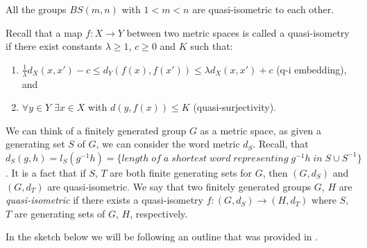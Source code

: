 \begin{corollary}
    All the groups $BS(m,n)$ with $1 < m <n$ are quasi-isometric to each other.
\end{corollary}

\begin{remark}
    Recall that a map $f: X \to Y$ between two metric spaces is called a quasi-isometry if there exist constants $\lambda \ge 1$, $c \ge 0$ and $K$ such that:
    \begin{enumerate}
        \item $\frac{1}{\lambda}d_X(x,x') - c \le d_Y(f(x),f(x')) \le \lambda d_X(x,x') + c$ (q-i embedding), and
        \item $\forall y \in Y$ $ \exists x \in X$ with $d(y,f(x)) \le K$ (quasi-surjectivity).
    \end{enumerate}
    We can think of a finitely generated group $G$ as a metric space, as given a generating set $S$ of $G$, we can consider the word metric $d_S$. Recall, that $d_S(g,h) = l_S(g^{-1}h) = \{length \; of \; a\;shortest \; word \; representing \; g^{-1}h \; in \; S\cup S^{-1} \}$. It is a fact that if $S$, $T$ are both finite generating sets for $G$, then $(G,d_S)$ and $(G,d_T)$ are quasi-isometric. We say that two finitely generated groups $G$, $H$ are \emph{quasi-isometric} if there exists a quasi-isometry $f: (G,d_S) \to (H,d_T)$ where $S$, $T$ are generating sets of $G$, $H$, respectively.
\end{remark}

In the sketch below we will be following an outline that was provided in \cite{WH01}.

